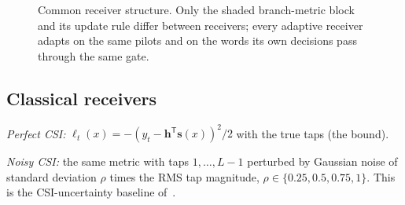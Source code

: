\documentclass[journal]{IEEEtran}
\begin{document}
\begin{figure}[t]
\centering

\caption{Common receiver structure. Only the shaded branch-metric block and its update rule differ between receivers; every adaptive receiver adapts on the same pilots and on the words its own decisions pass through the same gate.}
\label{fig:system}
\end{figure}

\begin{table}[t]
\centering
\caption{Receivers compared (BPSK, $L=4$, $T=136$ samples per word).}
\label{tab:receivers}
\setlength{\tabcolsep}{2.5pt}
\footnotesize
{}
\end{table}

\subsection{Classical receivers}
\emph{Perfect CSI:} $\ell_t(x)=-(y_t-\mathbf h^{\mathsf T}\mathbf s(x))^2/2$ with the true taps (the bound).

\emph{Noisy CSI:} the same metric with taps $1,\dots,L-1$ perturbed by Gaussian noise of standard deviation $\rho$ times the RMS tap magnitude, $\rho\in\{0.25,0.5,0.75,1\}$. This is the CSI-uncertainty baseline of~\cite{shlezinger2020viterbinet}.
\end{document}
